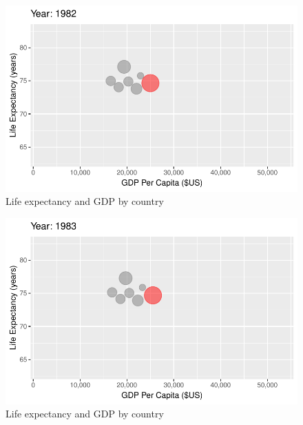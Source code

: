 \documentclass[
  letterpaper,
  DIV=11,
  numbers=noendperiod]{scrreport}
\theoremstyle{definition}
\theoremstyle{remark}
\begin{document}
\begin{figure}

{\centering \includegraphics{index_files/figure-pdf/fig-anim-country-55.pdf}

}

\caption{\label{fig-anim-country-55}Life expectancy and GDP by country}

\end{figure}

\begin{figure}

{\centering \includegraphics{index_files/figure-pdf/fig-anim-country-56.pdf}

}

\caption{\label{fig-anim-country-56}Life expectancy and GDP by country}

\end{figure}
\end{document}
